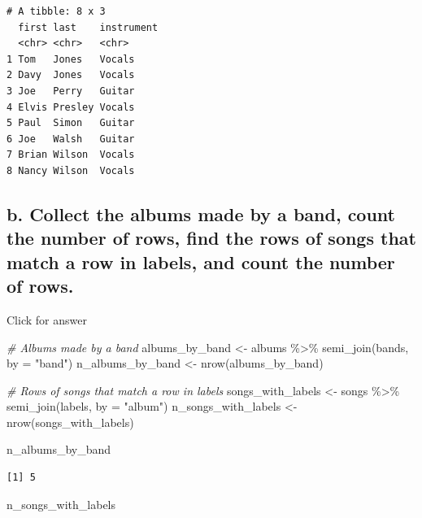 \documentclass[
]{book}
\newenvironment{Shaded}{\begin{snugshade}}{\end{snugshade}}
\newcommand{\AttributeTok}[1]{\textcolor[rgb]{0.77,0.63,0.00}{#1}}
\newcommand{\CommentTok}[1]{\textcolor[rgb]{0.56,0.35,0.01}{\textit{#1}}}
\newcommand{\FunctionTok}[1]{\textcolor[rgb]{0.00,0.00,0.00}{#1}}
\newcommand{\NormalTok}[1]{#1}
\newcommand{\OtherTok}[1]{\textcolor[rgb]{0.56,0.35,0.01}{#1}}
\newcommand{\SpecialCharTok}[1]{\textcolor[rgb]{0.00,0.00,0.00}{#1}}
\newcommand{\StringTok}[1]{\textcolor[rgb]{0.31,0.60,0.02}{#1}}
\begin{document}
\begin{verbatim}
# A tibble: 8 x 3
  first last    instrument
  <chr> <chr>   <chr>     
1 Tom   Jones   Vocals    
2 Davy  Jones   Vocals    
3 Joe   Perry   Guitar    
4 Elvis Presley Vocals    
5 Paul  Simon   Guitar    
6 Joe   Walsh   Guitar    
7 Brian Wilson  Vocals    
8 Nancy Wilson  Vocals    
\end{verbatim}

\hypertarget{b.-collect-the-albums-made-by-a-band-count-the-number-of-rows-find-the-rows-of-songs-that-match-a-row-in-labels-and-count-the-number-of-rows.}{%
\subsection{b. Collect the albums made by a band, count the number of rows, find the rows of songs that match a row in labels, and count the number of rows.}\label{b.-collect-the-albums-made-by-a-band-count-the-number-of-rows-find-the-rows-of-songs-that-match-a-row-in-labels-and-count-the-number-of-rows.}}

Click for answer

\begin{Shaded}
\begin{Highlighting}[]
\CommentTok{\# Albums made by a band}
\NormalTok{albums\_by\_band }\OtherTok{\textless{}{-}}\NormalTok{ albums }\SpecialCharTok{\%\textgreater{}\%} \FunctionTok{semi\_join}\NormalTok{(bands, }\AttributeTok{by =} \StringTok{"band"}\NormalTok{)}
\NormalTok{n\_albums\_by\_band }\OtherTok{\textless{}{-}} \FunctionTok{nrow}\NormalTok{(albums\_by\_band)}

\CommentTok{\# Rows of songs that match a row in labels}
\NormalTok{songs\_with\_labels }\OtherTok{\textless{}{-}}\NormalTok{ songs }\SpecialCharTok{\%\textgreater{}\%} \FunctionTok{semi\_join}\NormalTok{(labels, }\AttributeTok{by =} \StringTok{"album"}\NormalTok{)}
\NormalTok{n\_songs\_with\_labels }\OtherTok{\textless{}{-}} \FunctionTok{nrow}\NormalTok{(songs\_with\_labels)}

\NormalTok{n\_albums\_by\_band}
\end{Highlighting}
\end{Shaded}

\begin{verbatim}
[1] 5
\end{verbatim}

\begin{Shaded}
\begin{Highlighting}[]
\NormalTok{n\_songs\_with\_labels}
\end{Highlighting}
\end{Shaded}
\end{document}
